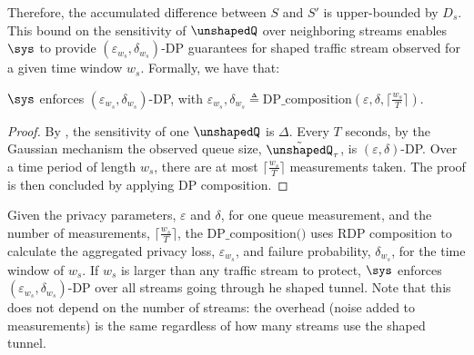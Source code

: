 Therefore, the accumulated difference between $S$ and $S'$ is upper-bounded by $D_s$.
This bound on the sensitivity of {$\unshapedQ$} over neighboring streams enables {$\sys$} to provide $(\varepsilon_{w_s}, \delta_{w_s})$-DP guarantees for shaped traffic stream observed for a given time window $w_s$. Formally, we have that:
\begin{proposition}\label{prop:dp}
  {$\sys$} enforces $(\varepsilon_{w_s}, \delta_{w_s})$-DP, with
  $\varepsilon_{w_s}, \delta_{w_s} \triangleq \textrm{DP\_composition}(\varepsilon,
  \delta, \lceil\frac{w_s}{T}\rceil)$.
\end{proposition}
\begin{proof}
By , the sensitivity of one {$\unshapedQ$} is $\Delta$. Every $T$ seconds, by the Gaussian mechanism the observed queue size, $\tilde{\unshapedQ}_{\tau}$, is $(\varepsilon, \delta)$-DP.
Over a time period of length $w_s$, there are at most $\lceil\frac{w_s}{T}\rceil$ measurements taken. The proof is then concluded by applying DP composition.
\end{proof}

Given the privacy parameters, $\varepsilon$ and $\delta$, for one queue measurement, and the number of measurements, $\lceil\frac{w_s}{T}\rceil$, the  $\textrm{DP\_composition()}$ uses RDP composition to calculate the aggregated privacy loss, $\varepsilon_{w_s}$, and failure probability, $\delta_{w_s}$, for the time window of $w_s$.
If $w_s$ is larger than any traffic stream to protect, {$\sys$} enforces $(\varepsilon_{w_s}, \delta_{w_s})$-DP over all streams going through he shaped tunnel. Note that this does not depend on the number of streams: the overhead (noise added to measurements) is the same regardless of how many streams use the shaped tunnel.







